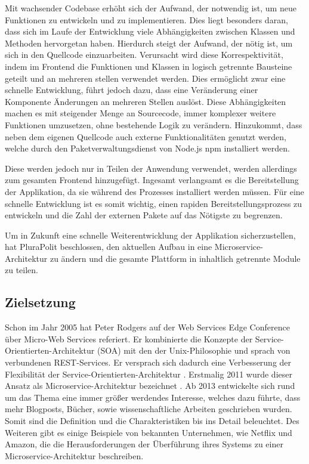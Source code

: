 Mit wachsender Codebase erhöht sich der Aufwand, der notwendig ist, um neue Funktionen zu entwickeln und zu implementieren. Dies liegt besonders daran, dass sich im Laufe der Entwicklung viele Abhängigkeiten zwischen Klassen und Methoden hervorgetan haben. Hierdurch steigt der Aufwand, der nötig ist, um sich in den Quellcode einzuarbeiten. Verursacht wird diese Korrespektivität, indem im Frontend die Funktionen und Klassen in logisch getrennte Bausteine geteilt und an mehreren stellen verwendet werden. Dies ermöglicht zwar eine schnelle Entwicklung, führt jedoch dazu, dass eine Veränderung einer Komponente Änderungen an mehreren Stellen auslöst. Diese Abhängigkeiten machen es mit steigender Menge an Sourcecode, immer komplexer weitere Funktionen umzusetzen, ohne bestehende Logik zu verändern. Hinzukommt, dass neben dem eigenen Quellcode auch externe Funktionalitäten genutzt werden, welche durch den Paketverwaltungsdienst von Node.js \parencite{nodejs} npm installiert werden.

Diese werden jedoch nur in Teilen der Anwendung verwendet, werden allerdings zum gesamten Frontend hinzugefügt. Ingesamt verlangsamt es die Bereitstellung der Applikation, da sie während des Prozesses installiert werden müssen. Für eine schnelle Entwicklung ist es somit wichtig, einen rapiden Bereitstellungsprozess zu entwickeln und die Zahl der externen Pakete auf das Nötigste zu begrenzen.

Um in Zukunft eine schnelle Weiterentwicklung der Applikation sicherzustellen, hat PluraPolit beschlossen, den aktuellen Aufbau in eine Microservice-Architektur zu ändern und die gesamte Plattform in inhaltlich getrennte Module zu teilen.

\subsection{Zielsetzung}
\label{sec:zielsetzung}

Schon im Jahr 2005 hat Peter Rodgers auf der Web Services Edge Conference über Micro-Web Services referiert. Er kombinierte die Konzepte der Service-Orientierten-Architektur (SOA) mit den der Unix-Philosophie und sprach von verbundenen REST-Services. Er versprach sich dadurch eine Verbesserung der Flexibilität der Service-Orientierten-Architektur \parencite[vlg.][]{rodgers_peter}. Erstmalig 2011 wurde dieser Ansatz als Microservice-Architektur bezeichnet \parencite[vlg.][]{dragoni_microservices_2017}. Ab 2013 entwickelte sich rund um das Thema eine immer größer werdendes Interesse, welches dazu führte, dass mehr Blogposts, Bücher, sowie wissenschaftliche Arbeiten geschrieben wurden. Somit sind die Definition und die Charakteristiken bis ins Detail beleuchtet. Des Weiteren gibt es einige Beispiele von bekannten Unternehmen, wie Netflix und Amazon, die die Herausforderungen der Überführung ihres Systems zu einer Microservice-Architektur beschreiben.

